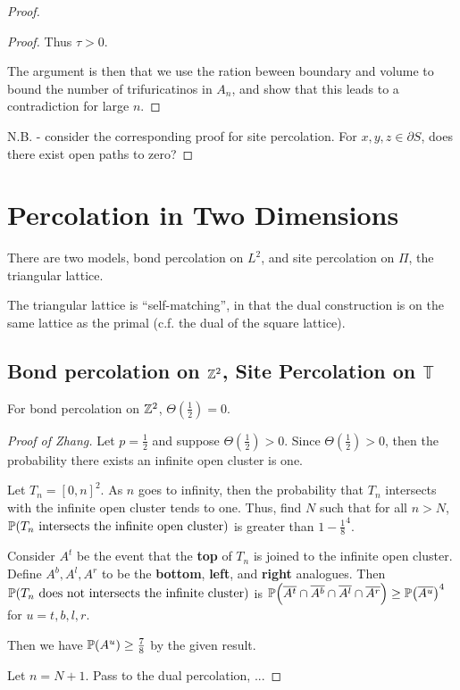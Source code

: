 \begin{proof}
\begin{proof}
    Thus $\tau > 0$.

    The argument is then that we use the ration beween boundary and
    volume to bound the number of trifuricatinos in $A_n$, and show
    that this leads to a contradiction for large $n$.
  \end{proof}
  


  N.B. - consider the corresponding proof for site percolation.  For
  $x, y, z \in \partial S$, does there exist open paths to zero?
\end{proof}

\section{Percolation in Two Dimensions}
\label{sec:perc-two-dimens}

There are two models, bond percolation on $L^{2}$, and site
percolation on $\Pi$, the triangular lattice.

The triangular lattice is ``self-matching'', in that the dual
construction is  on the same lattice as the primal (c.f. the dual of
the square lattice).

\subsection{Bond percolation on $\mathbb{Z}^2$, Site Percolation on $\mathbb{T}$}
\label{sec:bond-percolation-z2}

\begin{thm}
  \label{defn:random_walks_on_graphs:26}
  For bond percolation on $\mathbb{Z}^{2}$, $\Theta(\frac{1}{2}) = 0$.
\end{thm}

\begin{proof}[Proof of Zhang]
  Let $p = \frac{1}{2}$ and suppose $\Theta(\frac{1}{2}) > 0$.  Since
  $\Theta(\frac{1}{2}) > 0$, then the probability there exists an
  infinite open cluster is one.

  Let $T_{n} = [0, n]^{2}$.  As $n$ goes to infinity, then the
  probability that $T_{n}$ intersects with the infinite open cluster
  tends to one. Thus, find $N$ such that for all $n > N$,
  $\Prob{\text{$T_n$ intersects the infinite open cluster}}$ is
  greater than $1 - \frac{1}{8}^4$.

  Consider $A^{t}$ be the event that the \textbf{top} of $T_{n}$ is joined to
  the infinite open cluster.  Define $A^{b}, A^{l}, A^{r}$ to be the
  \textbf{bottom}, \textbf{left}, and \textbf{right} analogues.  Then
  $\Prob{\text{$T_{n}$ does not intersects the infinite cluster}}$ is
  $\Prob{\overline{A^{t}} \cap \overline{A^{b}} \cap \overline{A^{l}} \cap
    \overline{A^{r}}} \geq \Prob{\overline{A^{u}}}^{4}$ for $u = t, b,
  l, r$.

  Then we have $\Prob{A^{u}} \geq \frac{7}{8}$ by the given result.

  Let $n = N + 1$.  Pass to the dual percolation, ...

\end{proof}

